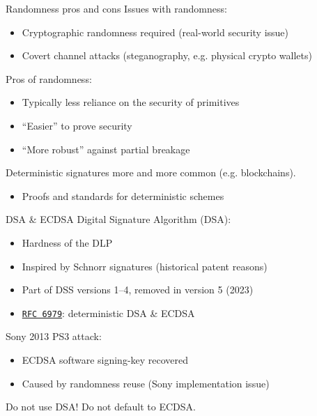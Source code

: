 \begin{frame}{Randomness pros and cons}
  \pause
  Issues with randomness:
  \begin{itemize}[<+(1)->]
    \item Cryptographic randomness required (real-world security issue)
    \item Covert channel attacks (steganography, e.g. physical crypto wallets)
  \end{itemize}

  \pause
  Pros of randomness:
  \begin{itemize}[<+(1)->]
    \item Typically less reliance on the security of primitives
    \item \enquote{Easier} to prove security
    \item \enquote{More robust} against partial breakage
  \end{itemize}

  \pause
  Deterministic signatures more and more common (e.g. blockchains).
  \begin{itemize}[<+(1)->]
    \item Proofs and standards for deterministic schemes
  \end{itemize}
\end{frame}

\begin{frame}{DSA \& ECDSA}
  \pause
  Digital Signature Algorithm (DSA):
  \begin{itemize}[<+(1)->]
    \item Hardness of the DLP
    \item Inspired by Schnorr signatures (historical patent reasons)
    \item Part of DSS versions 1--4, removed in version 5 (2023)
    \item \href{https://datatracker.ietf.org/doc/html/rfc6979}{\texttt{RFC 6979}}: deterministic DSA \& ECDSA
  \end{itemize}

  \pause
  Sony 2013 PS3 attack:
  \begin{itemize}
    \item ECDSA software signing-key recovered
    \item Caused by randomness reuse (Sony implementation issue)
  \end{itemize}
 
  \pause
  Do not use DSA! Do not default to ECDSA.
\end{frame}

